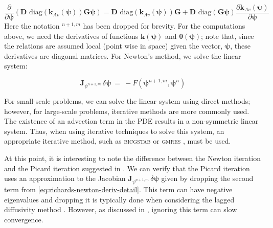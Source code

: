 \documentclass[preprint,review,3p,times,onecolumn,authoryear]{elsarticle}
\newcommand{\bfJ}{\mathbf{J}}
\newcommand{\bfk}{\mathbf{k}}
\newcommand{\bftheta}{\boldsymbol{\theta}}
\newcommand{\bfpsi}{\boldsymbol{\psi}}
\newcommand{\nnm}{^{n+1,m}}
\begin{document}
\begin{equation}
\label{eq:richards-newton-deriv-detail}
\frac{\partial}{\partial\boldsymbol{\psi}}
\left(
\mathbf{D}
    \text{ diag}\left(\mathbf{k}_{Av}(\boldsymbol{\psi})\right)
\mathbf{G} \boldsymbol{\psi}
\right)
=
\mathbf{D}
    \text{ diag}\left(\mathbf{k}_{Av}(\boldsymbol{\psi})\right)
\mathbf{G}
+
\mathbf{D}
    \text{ diag}\left(\mathbf{G}\boldsymbol{\psi}\right)
\frac{\partial\mathbf{k}_{Av}(\boldsymbol{\psi})}{\partial\boldsymbol{\psi}}
\end{equation}
Here the notation $\nnm$ has been dropped for brevity. For the computations above, we need the derivatives of functions $\bfk(\bfpsi)$ and $\bftheta(\bfpsi)$; note that, since the relations are assumed local (point wise in space) given the vector, $\bfpsi$, these derivatives are diagonal matrices. For Newton's method, we solve the linear system:

\begin{equation}
\label{eq:richards-newton-update}
\mathbf{J}_{\psi^{n+1,m}}\, \delta \boldsymbol{\psi}\ =\ -  F(\boldsymbol{\psi}^{n+1,m},\boldsymbol{\psi}^n)
\end{equation}

For small-scale problems, we can solve the linear system using direct methods; however, for large-scale problems, iterative methods are more commonly used. The existence of an advection term in the PDE results in a non-symmetric linear system. Thus, when using iterative techniques to solve this system, an appropriate iterative method, such as \textsc{bicgstab} or \textsc{gmres} \citep{saad, templates}, must be used.

At this point, it is interesting to note the difference between the Newton iteration and the Picard iteration suggested in \cite{Celia1990}. We can verify that the Picard iteration uses an approximation to the Jacobian $\bfJ_{\psi\nnm}\, \delta \bfpsi$ given by dropping the second term from \eqref{eq:richards-newton-deriv-detail}. This term can have negative eigenvalues and dropping it is typically done when considering the lagged diffusivity method \citep{vogelBook}. However, as discussed in \cite{vogelBook}, ignoring this term can slow convergence.
\end{document}
